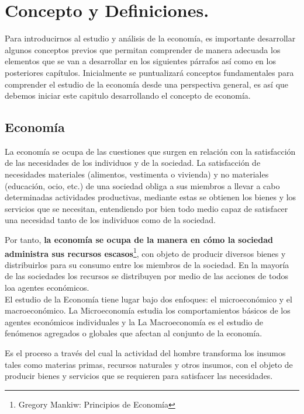 \section{Concepto y Definiciones.}
Para introducirnos al estudio y análisis de la economía, es importante desarrollar algunos conceptos previos que permitan comprender de manera adecuada los elementos que se van a desarrollar en los siguientes párrafos así como en los posteriores capítulos. Inicialmente se puntualizará conceptos fundamentales para comprender el estudio de la economía desde una perspectiva general, es así que debemos iniciar este capitulo desarrollando el concepto de economía. \\
\subsection{Economía}
\begin{caja}
	La economía se ocupa de las cuestiones que surgen en relación con la satisfacción de las necesidades de los individuos y de la sociedad. La satisfacción de necesidades materiales (alimentos, vestimenta o vivienda) y no materiales (educación, ocio, etc.) de una sociedad obliga a sus miembros a llevar a cabo determinadas actividades productivas, mediante estas se obtienen los bienes y los servicios que se necesitan, entendiendo por bien todo	medio capaz de satisfacer una necesidad tanto de los individuos como de la sociedad.
\end{caja}

Por tanto, \textbf{la economía se ocupa de la
manera en cómo la sociedad administra sus recursos escasos}\footnote{Gregory Mankiw: Principios de Economía}, con
objeto de producir diversos bienes y distribuirlos para su
consumo entre los miembros de la sociedad. En la mayoría de las sociedades los recursos se distribuyen por medio de las acciones de todos loa agentes económicos.\\

El estudio de la Economía tiene lugar bajo dos enfoques: el microeconómico y el macroeconómico. La Microeconomía estudia los comportamientos básicos de los agentes económicos individuales y la La Macroeconomía es el estudio de fenómenos agregados o globales que afectan al conjunto de la economía.

\begin{definicion}
	Es el proceso a través del cual la actividad del hombre transforma los insumos tales como materias primas, recursos naturales y otros insumos, con el objeto de producir bienes y servicios que se requieren para satisfacer las necesidades.
\end{definicion}	

